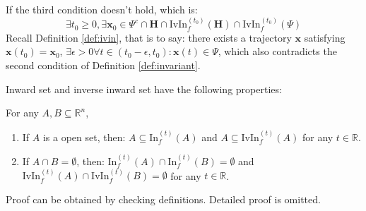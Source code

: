 \documentclass{article}
\begin{document}
\begin{Proof}
If the third condition doesn't hold, which is:
\begin{equation*}
	\exists t_0 \geq 0 ,\exists \boldsymbol{x}_0 \in \Psi^c \cap \boldsymbol{H} \cap \mathrm{IvIn}_f^{(t_0)}(\boldsymbol{H}) \cap \mathrm{IvIn}_f^{(t_0)}(\Psi)
\end{equation*}
Recall Definition \ref{def:ivin}, that is to say: there exists a trajectory $\boldsymbol{x}$ satisfying $\boldsymbol{x}(t_0) = \boldsymbol{x}_0$, $\exists \epsilon > 0 \forall t \in (t_0 - \epsilon, t_0) : \boldsymbol{x}(t) \in \Psi$, which also contradicts the second condition of Definition \ref{def:invariant}. 
\end{Proof}

Inward set and inverse inward set have the following properties:
\begin{Theorem}
\label{thm:property}
For any $A, B \subseteq \mathbb{R}^n$,
\begin{enumerate}
	\item If $A$ is a open set, then: $A \subseteq \mathrm{In}_f^{(t)}(A)$ and $A \subseteq \mathrm{IvIn}_f^{(t)}(A)$ for any $t \in \mathbb{R}$.
	\item If $A \cap B = \emptyset$, then: $\mathrm{In}_f^{(t)}(A) \cap \mathrm{In}_f^{(t)}(B) = \emptyset$ and $\mathrm{IvIn}_f^{(t)}(A) \cap \mathrm{IvIn}_f^{(t)}(B) = \emptyset$ for any $t \in \mathbb{R}$.
\end{enumerate}
\end{Theorem}

\begin{Proof}
Proof can be obtained by checking definitions. Detailed proof is omitted.
\end{Proof}
\end{document}
